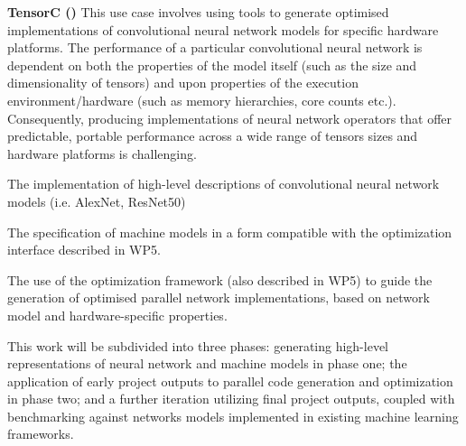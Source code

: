 \begin{Workpackage}{\thewpno}
\begin{Task}
\textbf{TensorC (\CODEPLAYshort{})}
This use case involves using \TheProject tools to generate optimised implementations of convolutional neural network models for specific hardware platforms. 
%
The performance of a particular convolutional neural network is dependent on both the properties of the model itself (such as the size and dimensionality of tensors) and upon properties of the execution environment/hardware (such as memory hierarchies, core counts etc.). Consequently, producing implementations of neural network operators that offer predictable, portable performance across a wide range of tensors sizes and hardware platforms is challenging.
%
\begin{compactitem}
\item The implementation of high-level descriptions of convolutional neural network models (i.e. AlexNet, ResNet50)
\item The specification of machine models in a form compatible with the optimization interface described in WP5.
\item The use of the optimization framework (also described in WP5) to guide the generation of optimised parallel network implementations, based on network model and hardware-specific properties.
\end{compactitem}

This work will be subdivided into three phases: generating high-level representations of neural network and machine models in phase one; the application of early project outputs to parallel code generation and optimization in phase two; and a further iteration utilizing final project outputs, coupled with benchmarking against networks models implemented in existing machine learning frameworks.


\end{Task}
\end{Workpackage}
